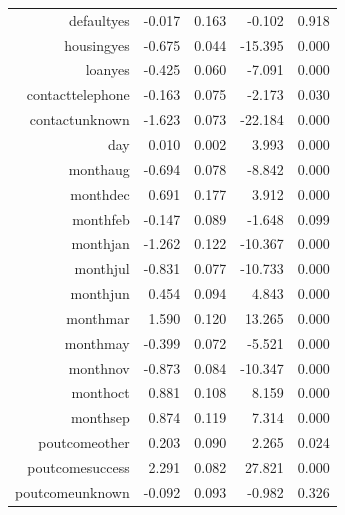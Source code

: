 \documentclass{article} %
\begin{document}
\begin{table}[h]
{\begin{tabular}{rrrrr}
$$  defaultyes & -0.017 & 0.163 & -0.102 & 0.918 \\ 
  housingyes & -0.675 & 0.044 & -15.395 & 0.000 \\ 
  loanyes & -0.425 & 0.060 & -7.091 & 0.000 \\ 
  contacttelephone & -0.163 & 0.075 & -2.173 & 0.030 \\ 
  contactunknown & -1.623 & 0.073 & -22.184 & 0.000 \\ 
  day & 0.010 & 0.002 & 3.993 & 0.000 \\ 
  monthaug & -0.694 & 0.078 & -8.842 & 0.000 \\ 
  monthdec & 0.691 & 0.177 & 3.912 & 0.000 \\ 
  monthfeb & -0.147 & 0.089 & -1.648 & 0.099 \\ 
  monthjan & -1.262 & 0.122 & -10.367 & 0.000 \\ 
  monthjul & -0.831 & 0.077 & -10.733 & 0.000 \\ 
  monthjun & 0.454 & 0.094 & 4.843 & 0.000 \\ 
  monthmar & 1.590 & 0.120 & 13.265 & 0.000 \\ 
  monthmay & -0.399 & 0.072 & -5.521 & 0.000 \\ 
  monthnov & -0.873 & 0.084 & -10.347 & 0.000 \\ 
  monthoct & 0.881 & 0.108 & 8.159 & 0.000 \\ 
  monthsep & 0.874 & 0.119 & 7.314 & 0.000 \\ 
  poutcomeother & 0.203 & 0.090 & 2.265 & 0.024 \\ 
  poutcomesuccess & 2.291 & 0.082 & 27.821 & 0.000 \\ 
  poutcomeunknown & -0.092 & 0.093 & -0.982 & 0.326 \\ 
   \hline
\end{tabular}
}
\end{table}
\end{document}
